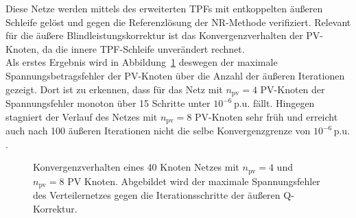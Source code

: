 Diese Netze werden mittels des erweiterten TPFs mit entkoppelten äußeren Schleife gelöst und gegen die Referenzlösung der NR-Methode verifiziert.
Relevant für die äußere Blindleistungskorrektur ist das Konvergenzverhalten der PV-Knoten, da die innere TPF-Schleife unverändert rechnet. \\

Als erstes Ergebnis wird in Abbildung~\ref{fig:outer_convergence_decoupled} deswegen der maximale Spannungsbetragsfehler der PV-Knoten über die Anzahl der äußeren Iterationen gezeigt. 
Dort ist zu erkennen, dass für das Netz mit $n_\mathrm{pv}=4$ PV-Knoten der Spannungsfehler monoton über 15 Schritte unter $10^{-6}\,\mathrm{p.u.}$ fällt.
Hingegen stagniert der Verlauf des Netzes mit $n_\mathrm{pv}=8$ PV-Knoten sehr früh und erreicht auch nach 100 äußeren Iterationen nicht die selbe Konvergenzgrenze von $10^{-6}\,\mathrm{p.u.}$.\\




\begin{figure}[htbp]
	\centering
	
	\caption{Konvergenzverhalten eines 40 Knoten Netzes mit $n_\mathrm{pv}=4$ und $n_\mathrm{pv}=8$ PV Knoten. Abgebildet wird der maximale Spannungsfehler des Verteilernetzes gegen die Iterationsschritte der äußeren Q-Korrektur.}
	\label{fig:outer_convergence_decoupled}
\end{figure}

%
%	


